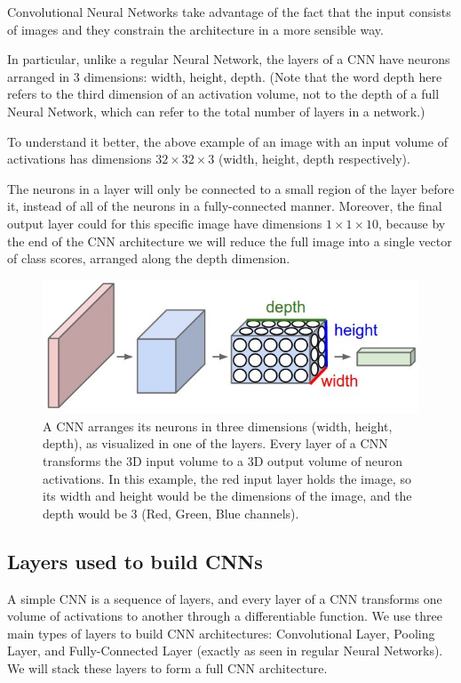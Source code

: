 \documentclass[%
oneside,                 %
final,                   %
10pt]{article}
\begin{document}
Convolutional Neural Networks take advantage of the fact that the
input consists of images and they constrain the architecture in a more
sensible way. 

In particular, unlike a regular Neural Network, the
layers of a CNN have neurons arranged in 3 dimensions: width,
height, depth. (Note that the word depth here refers to the third
dimension of an activation volume, not to the depth of a full Neural
Network, which can refer to the total number of layers in a network.)

To understand it better, the above example of an image 
with an input volume of
activations has dimensions $32\times 32\times 3$ (width, height,
depth respectively). 

The neurons in a layer will
only be connected to a small region of the layer before it, instead of
all of the neurons in a fully-connected manner. Moreover, the final
output layer could  for this specific image have dimensions $1\times 1 \times 10$, 
because by the
end of the CNN architecture we will reduce the full image into a
single vector of class scores, arranged along the depth
dimension. 


\begin{figure}[!ht]  %
  \centerline{\includegraphics[width=0.6\linewidth]{figslides/cnn.jpeg}}
  \caption{
  A CNN arranges its neurons in three dimensions (width, height, depth), as visualized in one of the layers. Every layer of a CNN transforms the 3D input volume to a 3D output volume of neuron activations. In this example, the red input layer holds the image, so its width and height would be the dimensions of the image, and the depth would be 3 (Red, Green, Blue channels).
  }
\end{figure}




\subsection*{Layers used to build CNNs}


A simple CNN is a sequence of layers, and every layer of a CNN
transforms one volume of activations to another through a
differentiable function. We use three main types of layers to build
CNN architectures: Convolutional Layer, Pooling Layer, and
Fully-Connected Layer (exactly as seen in regular Neural Networks). We
will stack these layers to form a full CNN architecture.
\end{document}
